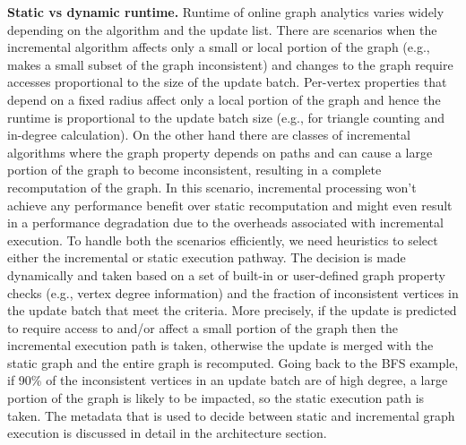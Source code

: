 \textbf{Static vs dynamic runtime.}
Runtime of online graph analytics varies widely depending on the algorithm and the update list. There are scenarios when the incremental algorithm affects only a small or local portion of the graph (e.g., makes a small subset of the graph inconsistent) and changes to the graph require accesses proportional to the size of the update batch. Per-vertex properties that depend on  a fixed radius affect only a local portion of the graph and hence the runtime is proportional to the update batch size (e.g., for triangle counting and in-degree calculation). On the other hand there are classes of incremental algorithms where the graph property depends on paths and can cause a large portion of the graph to become inconsistent, resulting in a complete  recomputation of the graph. In this scenario, incremental processing won’t achieve any performance benefit over  static recomputation and might even result in a performance degradation due to the overheads associated with incremental execution. To handle both the scenarios efficiently,  we need heuristics to select either the incremental or static execution pathway. The decision is made dynamically and taken based on a set of built-in or user-defined graph property checks (e.g., vertex degree information) and the fraction of inconsistent vertices in the update batch that meet the criteria. More precisely, if the update is predicted to require access to and/or affect a small portion of the graph then the incremental execution path is taken, otherwise the update is merged with the static graph and the entire graph is recomputed.  Going back to the BFS example, if 90\% of the inconsistent vertices in an update batch are of high degree, a large portion of the graph is likely to be impacted, so the static execution path is taken. The metadata that is used to decide between static and incremental graph execution is discussed in detail in the architecture section.

